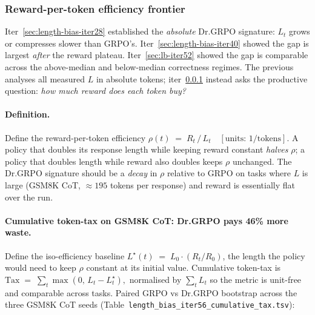 
\subsubsection{Reward-per-token efficiency frontier}\label{sec:lb-iter56}

Iter~\ref{sec:length-bias-iter28} established the \emph{absolute} Dr.GRPO signature:
$L_t$ grows or compresses slower than GRPO's. Iter~\ref{sec:length-bias-iter40}
showed the gap is largest \emph{after} the reward plateau. Iter~\ref{sec:lb-iter52}
showed the gap is comparable across the above-median and below-median
correctness regimes. The previous analyses all measured $L$ in absolute
tokens; iter~\ref{sec:lb-iter56} instead asks the productive question:
\emph{how much reward does each token buy?}

\paragraph{Definition.}
Define the reward-per-token efficiency
$\rho(t) \;=\; R_t \,/\, L_t \quad [\text{units: } 1/\text{tokens}].$
A policy that doubles its response length while keeping reward constant
\emph{halves} $\rho$; a policy that doubles length while reward also
doubles keeps $\rho$ unchanged. The Dr.GRPO signature should be a
\emph{decay} in $\rho$ relative to GRPO on tasks where $L$ is large
(GSM8K CoT, $\approx 195$ tokens per response) and reward is essentially
flat over the run.

\paragraph{Cumulative token-tax on GSM8K CoT: Dr.GRPO pays 46\% more waste.}
Define the iso-efficiency baseline $L^\star(t) \;=\; L_0 \cdot (R_t / R_0)$,
the length the policy would need to keep $\rho$ constant at its
initial value. Cumulative token-tax is
$\mathrm{Tax} \;=\; \sum_t \max(0,\, L_t - L^\star_t),$
normalised by $\sum_t L_t$ so the metric is unit-free and comparable
across tasks. Paired GRPO vs Dr.GRPO bootstrap across the three GSM8K
CoT seeds (Table~\texttt{length\_bias\_iter56\_cumulative\_tax.tsv}):

